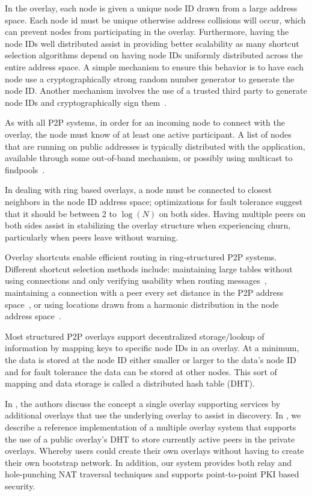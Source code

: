 \documentclass[letterpaper,twocolumn,10pt]{article}
\begin{document}
In the overlay, each node is given a unique node ID drawn from a large address
space.  Each node id must be unique otherwise address collisions will occur,
which can prevent nodes from participating in the overlay.  Furthermore, having
the node IDs well distributed assist in providing better scalability as many
shortcut selection algorithms depend on having node IDs uniformly distributed
across the entire address space.  A simple mechanism to ensure this behavior is
to have each node use a cryptographically strong random number generator to
generate the node ID.  Another mechanism involves the use of a trusted third
party to generate node IDs and cryptographically sign them~\cite{secure_routing}.

As with all P2P systems, in order for an incoming node to connect with
the overlay, the node must know of at least one active participant.  A list of
nodes that are running on public addresses is typically distributed with the
application, available through some out-of-band mechanism, or possibly using
multicast to findpools~\cite{pastry}.

In dealing with ring based overlays, a node must be connected to closest
neighbors in the node ID address space; optimizations for fault tolerance
suggest that it should be between 2 to $\log(N)$ on both sides.  Having
multiple peers on both sides assist in stabilizing the overlay structure
when experiencing churn, particularly when peers leave without warning.

Overlay shortcuts enable efficient routing in ring-structured P2P systems.
Different shortcut selection methods include: maintaining large tables without
using connections and only verifying usability when routing
messages~\cite{pastry, kademlia}, maintaining a connection with a peer every
set distance in the P2P address space~\cite{chord}, or using locations drawn
from a harmonic distribution in the node address space~\cite{symphony}.

Most structured P2P overlays support decentralized storage/lookup of information by
mapping keys to specific node IDs in an overlay.  At a minimum, the data is stored
at the node ID either smaller or larger to the data's node ID and for fault
tolerance the data can be stored at other nodes.  This sort of mapping
and data storage is called a distributed hash table (DHT).

In \cite{one_ring, randpeer, can_multicast}, the authors
discuss the concept a single overlay supporting services by additional overlays
that use the underlying overlay to assist in discovery.  In \cite{icdcs10}, we
describe a reference implementation of a multiple overlay system that supports
the use of a public overlay's DHT to store currently active peers in the private
overlays.  Whereby users could create their own overlays without having to
create their own bootstrap network.  In addition, our system provides both relay
and hole-punching NAT traversal techniques and supports point-to-point PKI
based security.
\end{document}
